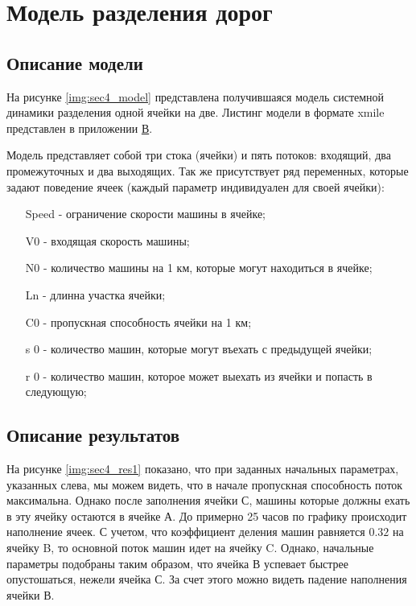 \section{Модель разделения дорог}

\subsection{Описание модели}

На рисунке \ref{img:sec4_model} представлена получившаяся модель системной динамики разделения одной ячейки на две. Листинг модели в формате xmile представлен в приложении \hyperlink{app-c}{В}.

Модель представляет собой три стока (ячейки) и пять потоков: входящий, два промежуточных и два выходящих.
Так же присутствует ряд переменных, которые задают поведение ячеек (каждый параметр индивидуален для своей ячейки):
\begin{itemize}
    \item[Speed] - ограничение скорости машины в ячейке;
    \item[V0] - входящая скорость машины;
    \item[N0] - количество машины на 1 км, которые могут находиться в ячейке;
    \item[Ln] - длинна участка ячейки;
    \item[C0] - пропускная способность ячейки на 1 км;
    \item[s 0] - количество машин, которые могут въехать с предыдущей ячейки;
    \item[r 0] - количество машин, которое может выехать из ячейки и попасть в следующую;
\end{itemize}


\subsection{Описание результатов}

На рисунке \ref{img:sec4_res1} показано, что при заданных начальных параметрах, указанных слева, мы можем видеть, что в начале пропускная способность поток максимальна. Однако после заполнения ячейки С, машины которые должны ехать в эту ячейку остаются в ячейке А. До примерно 25 часов по графику происходит наполнение ячеек. С учетом, что коэффициент деления машин равняется $0.32$ на ячейку B, то основной поток машин идет на ячейку C. Однако, начальные параметры подобраны таким образом, что ячейка В успевает быстрее опустошаться, нежели ячейка С. За счет этого можно видеть падение наполнения ячейки В.

